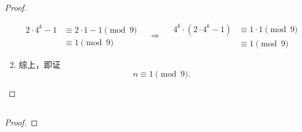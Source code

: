 \documentclass[UTF8]{ctexart}
\begin{document}
\begin{proof}
\begin{enumerate}
\[\begin{aligned}
                2\cdot 4^{k} - 1
                & \equiv 
                2\cdot 1 -1 \pmod{9}\\
                & \equiv
                1 \pmod{9}
            \end{aligned}
            \quad \Rightarrow \quad
            \begin{aligned}
                4^{k}\cdot (2\cdot 4^{k} -1)
                & \equiv
                1\cdot 1 \pmod{9}\\
                & \equiv
                1 \pmod{9}
            \end{aligned}  
        \]
        \item []综上，即证
        \[
            n \equiv 1 \pmod{9} .
        \]
    \end{enumerate}
\end{proof}

\subsection{}   %
\begin{proof}
    
\end{proof}
\end{document}
